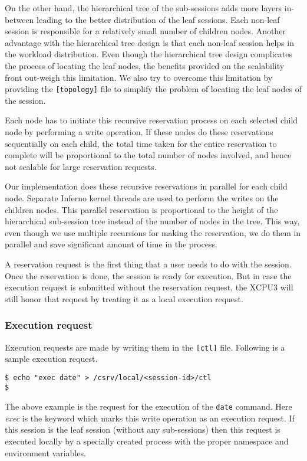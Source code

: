 On the other hand, the hierarchical tree of the sub-sessions adds more layers
in-between leading to the better distribution of the leaf sessions.  Each
non-leaf session is responsible for a relatively small number of children
nodes. Another advantage with the hierarchical tree design is that each non-leaf
session helps in the workload distribution.
Even though the hierarchical tree design complicates the process of locating the
leaf nodes, the benefits
provided on the scalability front out-weigh this limitation.  We also try to
overcome this limitation
by providing the \texttt{[topology]} file to simplify the problem of locating 
the leaf nodes of the session.


Each node has to initiate this recursive reservation process on each selected
child node by performing a write operation. If these nodes do these reservations
sequentially on each child, the total time taken for the entire reservation
to complete will be proportional to the total number of nodes involved, and
hence not scalable for large reservation requests.


Our implementation does these recursive reservations in parallel for each child
node.  Separate Inferno kernel threads are used to perform the writes on the
children nodes.  This parallel reservation is proportional to the height of the
hierarchical sub-session tree instead of the number of nodes in the tree. This
way, even though we use multiple recursions for making the reservation, we do
them in parallel and save significant amount of time in the process.


A reservation request is the first thing that a user needs to do with the
session.  Once the reservation is done, the session is ready for execution. 
But in case the execution request is submitted without the reservation request,
the XCPU3 will still honor that request by treating it as a local execution
request.

\subsubsection{Execution request}
Execution requests are made by writing them in the \texttt{[ctl]} file. 
Following is a sample execution request.
\begin{verbatim}
$ echo "exec date" > /csrv/local/<session-id>/ctl
$ 
\end{verbatim}
The above example is the request for the execution of the \texttt{date} command.
Here \textit{exec} is the keyword which marks this write operation as
an execution request. If this session is the leaf session (without any
sub-sessions) then this request is executed locally by a specially created
process with the proper namespace and environment variables.


